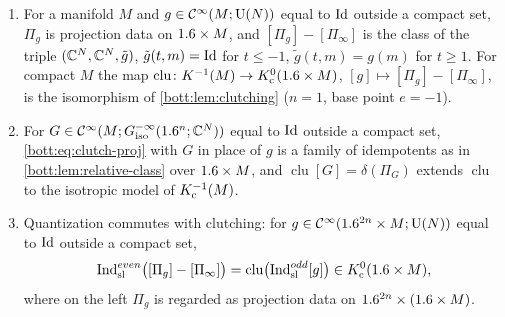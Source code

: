 \begin{lemma}\label{bott:lem:sl-clutching}
  \begin{enumerate}[label=(\roman*)]
  \item For a manifold $M$ and $g\in\mathcal{C}^\infty(M;\mathrm U(N))$ equal to $\operatorname{Id}$ outside a compact set,
    $\Pi_g$ is projection data on $1.6\times M$, and $[\Pi_g]-[\Pi_\infty]$ is the class of
    the triple $(\mathbb{C}^N,\mathbb{C}^N,\tilde g)$, $\tilde g(t,m)=\operatorname{Id}$ for $t\le-1$, $\tilde g(t,m)=g(m)$
    for $t\ge1$. For compact $M$ the map
    $\operatorname{clu}\colon K^{-1}(M)\to K_{\mathrm{c}}^0(1.6\times M)$, $[g]\mapsto[\Pi_g]-[\Pi_\infty]$, is
    the isomorphism of \cref{bott:lem:clutching} ($n=1$, base point $e=-1$).
  \item For $G\in\mathcal{C}^\infty(M;G^{-\infty}_{\mathrm{iso}}(1.6^n;\mathbb{C}^N))$ equal to $\operatorname{Id}$ outside a compact set,
    \eqref{bott:eq:clutch-proj} with $G$ in place of $g$ is a family of idempotents as in
    \cref{bott:lem:relative-class} over $1.6\times M$, and
    $\operatorname{clu}[G]=\delta(\Pi_G)$ extends $\operatorname{clu}$ to the isotropic model
    of $K_{\mathrm{c}}^{-1}(M)$.
  \item Quantization commutes with clutching: for $g\in\mathcal{C}^\infty(1.6^{2n}\times M;\mathrm U(N))$
    equal to $\operatorname{Id}$ outside a compact set,
    \begin{equation*}
      \operatorname{Ind}^{even}_{\mathrm{sl}}\bigl([\Pi_g]-[\Pi_\infty]\bigr)=\operatorname{clu}\bigl(\operatorname{Ind}^{odd}_{\mathrm{sl}}[g]\bigr)
      \in K_{\mathrm{c}}^0(1.6\times M),
    \end{equation*}
    where on the left $\Pi_g$ is regarded as projection data on $1.6^{2n}\times(1.6\times M)$.
  \end{enumerate}
\end{lemma}
